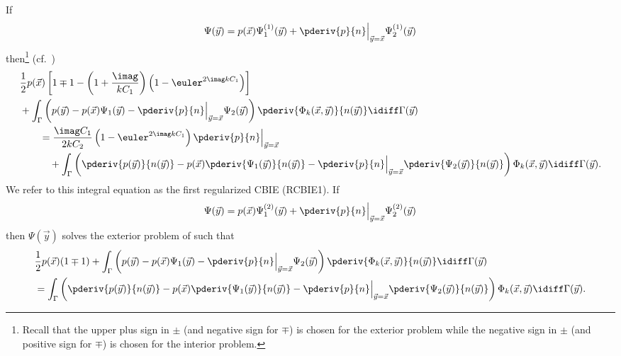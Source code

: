 If
\begin{equation*}
	\Psi(\vec{y}) = p(\vec{x})\Psi_1^{(1)}(\vec{y}) + \pderiv{p}{n}\Big\vert_{\vec{y}=\vec{x}}\Psi_2^{(1)}(\vec{y})
\end{equation*}
then\footnote{Recall that the upper plus sign in $\pm$ (and negative sign for $\mp$) is chosen for the exterior problem while the negative sign in $\pm$ (and positive sign for $\mp$) is chosen for the interior problem.} (cf.~\cite{Sun2015bri})
\begin{equation}\label{Eq3:RCBIE1}
\begin{aligned}
	&\frac{1}{2}p(\vec{x})\left[1\mp 1 - \left(1+\frac{\imag}{kC_1}\right)\left(1-\euler^{2\imag kC_1}\right)\right] \\
	&+ \int_\Gamma \left(p(\vec{y}) - p(\vec{x})\Psi_1(\vec{y}) - \pderiv{p}{n}\Big\vert_{\vec{y}=\vec{x}}\Psi_2(\vec{y})\right)\pderiv{\Phi_k(\vec{x},\vec{y})}{n(\vec{y})}  \idiff\Gamma(\vec{y}) \\
	&{\hskip2em\relax}= \frac{\imag C_1}{2kC_2} \left(1-\euler^{2\imag kC_1}\right)\pderiv{p}{n}\Big\vert_{\vec{y}=\vec{x}}\\
	&{\hskip3em\relax}+  \int_\Gamma \left(\pderiv{p(\vec{y})}{n(\vec{y})} - p(\vec{x})\pderiv{\Psi_1(\vec{y})}{n(\vec{y})} - \pderiv{p}{n}\Big\vert_{\vec{y}=\vec{x}}\pderiv{\Psi_2(\vec{y})}{n(\vec{y})}\right)\Phi_k(\vec{x},\vec{y}) \idiff\Gamma(\vec{y}).
\end{aligned}
\end{equation}
We refer to this integral equation as the first regularized CBIE (RCBIE1). If
\begin{equation*}
	\Psi(\vec{y}) = p(\vec{x})\Psi_1^{(2)}(\vec{y}) + \pderiv{p}{n}\Big\vert_{\vec{y}=\vec{x}}\Psi_2^{(2)}(\vec{y})
\end{equation*}
then $\Psi(\vec{y})$ solves the exterior problem of  such that
\begin{equation}\label{Eq3:RCBIE2}
\begin{aligned}
	&\frac{1}{2}p(\vec{x})(1\mp 1) + \int_\Gamma \left(p(\vec{y}) - p(\vec{x})\Psi_1(\vec{y}) - \pderiv{p}{n}\Big\vert_{\vec{y}=\vec{x}}\Psi_2(\vec{y})\right)\pderiv{\Phi_k(\vec{x},\vec{y})}{n(\vec{y})}  \idiff\Gamma(\vec{y}) \\
	&= \int_\Gamma \left(\pderiv{p(\vec{y})}{n(\vec{y})} - p(\vec{x})\pderiv{\Psi_1(\vec{y})}{n(\vec{y})} - \pderiv{p}{n}\Big\vert_{\vec{y}=\vec{x}}\pderiv{\Psi_2(\vec{y})}{n(\vec{y})}\right)\Phi_k(\vec{x},\vec{y}) \idiff\Gamma(\vec{y}).
\end{aligned}
\end{equation}
